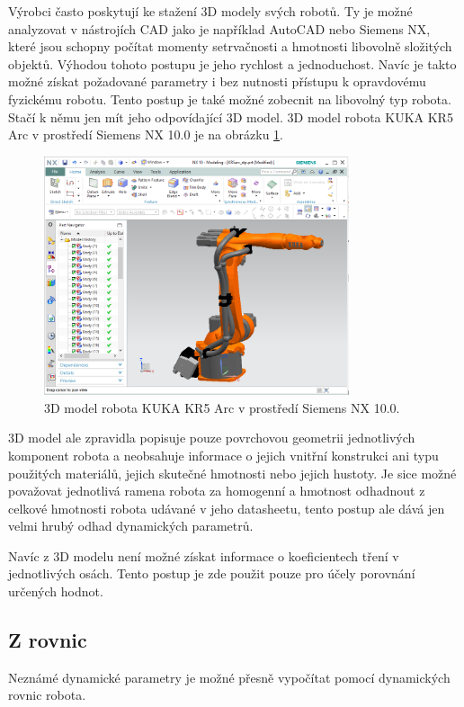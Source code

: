 Výrobci často poskytují ke stažení 3D modely svých robotů. Ty je možné analyzovat v nástrojích CAD jako je například AutoCAD nebo Siemens NX, které jsou schopny počítat momenty setrvačnosti a hmotnosti libovolně složitých objektů. Výhodou tohoto postupu je jeho rychlost a jednoduchost. Navíc je takto možné získat požadované parametry i bez nutnosti přístupu k opravdovému fyzickému robotu. Tento postup je také možné zobecnit na libovolný typ robota. Stačí k němu jen mít jeho odpovídající 3D model. 3D model robota KUKA KR5 Arc v prostředí Siemens NX 10.0 je na obrázku \ref{kuka_3d_pic}.

\begin{figure}[ht]
    \includegraphics[width=0.8\textwidth]{kuka_3d}
    \caption{3D model robota KUKA KR5 Arc v prostředí Siemens NX 10.0.}
    \label{kuka_3d_pic}
\end{figure}

3D model ale zpravidla popisuje pouze povrchovou geometrii jednotlivých komponent robota a neobsahuje informace o jejich vnitřní konstrukci ani typu použitých materiálů, jejich skutečné hmotnosti nebo jejich hustoty. Je sice možné považovat jednotlivá ramena robota za homogenní a hmotnost odhadnout z celkové hmotnosti robota udávané v jeho datasheetu, tento postup ale dává jen velmi hrubý odhad dynamických parametrů. 

Navíc z 3D modelu není možné získat informace o koeficientech tření v jednotlivých osách. Tento postup je zde použit pouze pro účely porovnání určených hodnot.
\label{z_3d_modelu_sec}

\subsection{Z rovnic}
\label{z_rovnic_sec}
Neznámé dynamické parametry je možné přesně vypočítat pomocí dynamických rovnic robota. 


